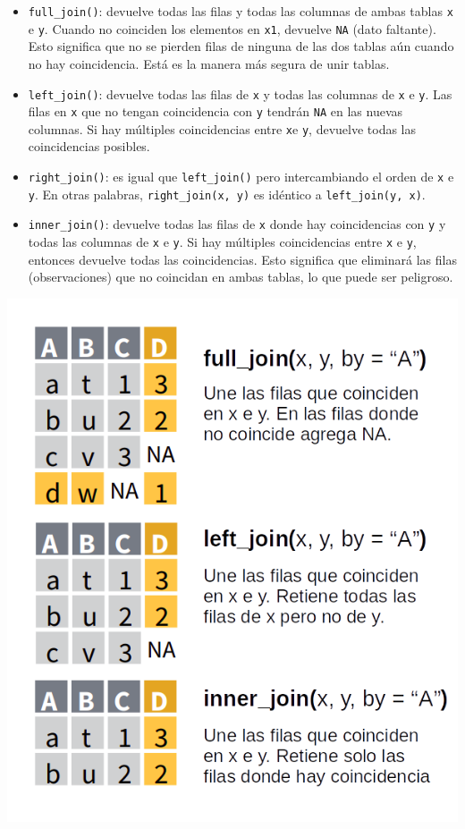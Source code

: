 \documentclass[
  openany]{book}
\begin{document}
\begin{itemize}
\item
  \texttt{full\_join()}: devuelve todas las filas y todas las columnas de ambas tablas \texttt{x} e \texttt{y}.
  Cuando no coinciden los elementos en \texttt{x1}, devuelve \texttt{NA} (dato faltante).
  Esto significa que no se pierden filas de ninguna de las dos tablas aún cuando no hay coincidencia.
  Está es la manera más segura de unir tablas.
\item
  \texttt{left\_join()}: devuelve todas las filas de \texttt{x} y todas las columnas de \texttt{x} e \texttt{y}.
  Las filas en \texttt{x} que no tengan coincidencia con \texttt{y} tendrán \texttt{NA} en las nuevas columnas.
  Si hay múltiples coincidencias entre \texttt{x}e \texttt{y}, devuelve todas las coincidencias posibles.
\item
  \texttt{right\_join()}: es igual que \texttt{left\_join()} pero intercambiando el orden de \texttt{x} e \texttt{y}.
  En otras palabras, \texttt{right\_join(x,\ y)} es idéntico a \texttt{left\_join(y,\ x)}.
\item
  \texttt{inner\_join()}: devuelve todas las filas de \texttt{x} donde hay coincidencias con \texttt{y} y todas las columnas de \texttt{x} e \texttt{y}.
  Si hay múltiples coincidencias entre \texttt{x} e \texttt{y}, entonces devuelve todas las coincidencias.
  Esto significa que eliminará las filas (observaciones) que no coincidan en ambas tablas, lo que puede ser peligroso.
\end{itemize}

\includegraphics{img/join_family.png}
\end{document}
